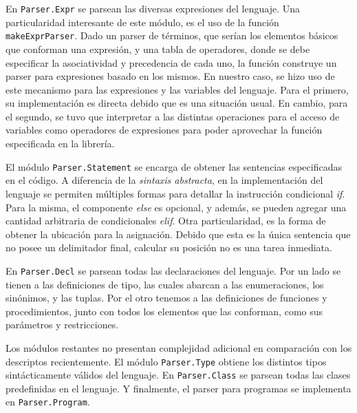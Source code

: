 En \lstinline[style = module]{Parser.Expr} se parsean las diversas expresiones del lenguaje.
Una particularidad interesante de este módulo, es el uso de la función \lstinline[style = haskell]{makeExprParser}.
Dado un parser de términos, que serían los elementos básicos que conforman una expresión, y una tabla de operadores, donde se debe especificar la asociatividad y precedencia de cada uno, la función construye un parser para expresiones basado en los mismos.
En nuestro caso, se hizo uso de este mecanismo para las expresiones y las variables del lenguaje.
Para el primero, su implementación es directa debido que es una situación usual.
En cambio, para el segundo, se tuvo que interpretar a las distintas operaciones para el acceso de variables como operadores de expresiones para poder aprovechar la función especificada en la librería.

El módulo \lstinline[style = module]{Parser.Statement} se encarga de obtener las sentencias especificadas en el código.
A diferencia de la \textit{sintaxis abstracta}, en la implementación del lenguaje se permiten múltiples formas para detallar la instrucción condicional \textit{if}.
Para la misma, el componente \textit{else} es opcional, y además, se pueden agregar una cantidad arbitraria de condicionales \textit{elif}.
Otra particularidad, es la forma de obtener la ubicación para la asignación.
Debido que esta es la única sentencia que no posee un delimitador final, calcular su posición no es una tarea inmediata.

En \lstinline[style = module]{Parser.Decl} se parsean todas las declaraciones del lenguaje.
Por un lado se tienen a las definiciones de tipo, las cuales abarcan a las enumeraciones, los sinónimos, y las tuplas.
Por el otro tenemos a las definiciones de funciones y procedimientos, junto con todos los elementos que las conforman, como sus parámetros y restricciones.

Los módulos restantes no presentan complejidad adicional en comparación con los descriptos recientemente.
El módulo \lstinline[style = module]{Parser.Type} obtiene los distintos tipos sintácticamente válidos del lenguaje.
En \lstinline[style = module]{Parser.Class} se parsean todas las clases predefinidas en el lenguaje.
Y finalmente, el parser para programas se implementa en \lstinline[style = module]{Parser.Program}.